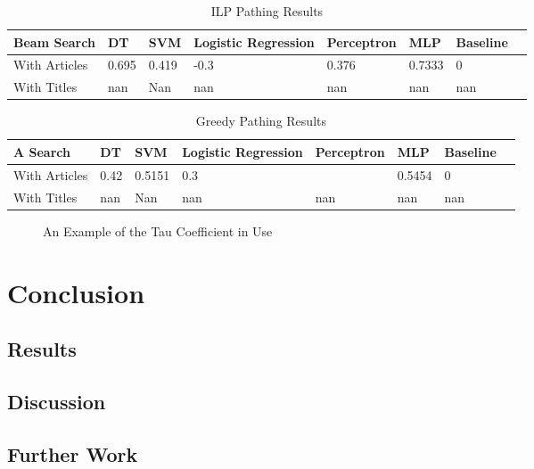 \documentclass[bsc,frontabs,twoside,singlespacing,parskip,deptreport]{infthesis}     %
\begin{document}
\begin{table}[H]
\centering
\label{table:ILP-results}
\begin{tabular}{|l|l|l|l|l|l|l|l|}
  \hline
  Beam Search & DT & SVM &Logistic Regression & Perceptron & MLP & Baseline\\
  \hline
With Articles & 0.695 & 0.419 & -0.3 & 0.376   & 0.7333  & 0\\
\hline
With Titles & nan & Nan & nan & nan  & nan & nan\\
\hline
\end{tabular}
\caption{ILP Pathing Results}
\end{table}



\begin{table}[H]
\centering
\label{table:greedy-results}
\begin{tabular}{|l|l|l|l|l|l|l|l|}
  \hline
  A\* Search & DT & SVM &Logistic Regression & Perceptron & MLP & Baseline\\
  \hline
With Articles & 0.42 & 0.5151 & 0.3 &    & 0.5454  & 0\\
\hline
With Titles & nan & Nan & nan & nan  & nan & nan\\
\hline
\end{tabular}
\caption{Greedy Pathing Results}
\end{table}


\begin{figure}
  \caption{An Example of the Tau Coefficient in Use}
  \label{fig:tau}
\end{figure}




\chapter{Conclusion}
\section{Results}
\section{Discussion}
\section{Further Work}
\end{document}
